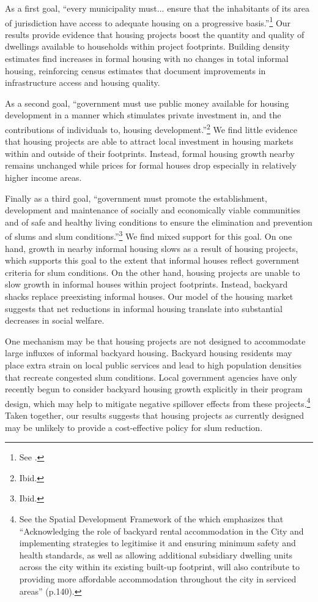 \documentclass[12pt]{article}
\begin{document}
As a first goal, ``every municipality must... ensure that the inhabitants of its area of jurisdiction have access to adequate housing on a progressive basis.''\footnote{See \cite{housingact}.}  Our results provide evidence that housing projects boost the quantity and quality of dwellings available to households within project footprints.  Building density estimates find increases in formal housing with no changes in total informal housing, reinforcing census estimates that document improvements in infrastructure access and housing quality.

As a second goal, ``government must use public money available for housing development in a manner which stimulates private investment in, and the contributions of individuals to, housing development.''\footnote{Ibid.}    We find little evidence that housing projects are able to attract local investment in housing markets within and outside of their footprints.  Instead, formal housing growth nearby remains unchanged while prices for formal houses drop especially in relatively higher income areas.

Finally as a third goal, ``government must promote the establishment, development and maintenance of socially and economically viable communities and of safe and healthy living conditions to ensure the elimination and prevention of slums and slum conditions.''\footnote{Ibid.}  We find mixed support for this goal.  On one hand, growth in nearby informal housing slows as a result of housing projects, which supports this goal to the extent that informal houses reflect government criteria for slum conditions.  On the other hand, housing projects are unable to slow growth in informal houses within project footprints.  Instead, backyard shacks replace preexisting informal houses.  Our model of the housing market suggests that net reductions in informal housing translate into substantial decreases in social welfare.  

One mechanism may be that housing projects are not designed to accommodate large influxes of informal backyard housing.  Backyard housing residents may place extra strain on local public services and lead to high population densities that recreate congested slum conditions.  Local government agencies have only recently begun to consider backyard housing growth explicitly in their program design, which may help to mitigate negative spillover effects from these projects.\footnote{ See the Spatial Development Framework of the \cite{sdf} which emphasizes that ``Acknowledging the role of backyard rental accommodation in the City and implementing strategies to legitimise it and ensuring minimum safety and health standards, as well as allowing additional subsidiary dwelling units across the city within its existing built-up footprint, will also contribute to providing more affordable accommodation throughout the city in serviced areas'' (p.140).}  Taken together, our results suggests that housing projects as currently designed may be unlikely to provide a cost-effective policy for slum reduction. 
\end{document}
